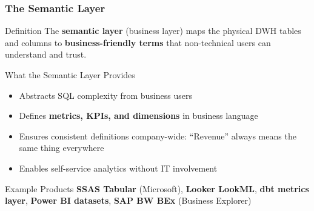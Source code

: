 \begin{frame}
  \frametitle{The Semantic Layer}

  \begin{block}{Definition}
    The \textbf{semantic layer} (business layer) maps the physical DWH
    tables and columns to \textbf{business-friendly terms} that
    non-technical users can understand and trust.
  \end{block}

  \begin{block}{What the Semantic Layer Provides}
    \begin{itemize}
      \item Abstracts SQL complexity from business users
      \item Defines \textbf{metrics, KPIs, and dimensions} in business language
      \item Ensures consistent definitions company-wide:
        ``Revenue'' always means the same thing everywhere
      \item Enables self-service analytics without IT involvement
    \end{itemize}
  \end{block}

  \begin{examples}{Example Products}
    \textbf{SSAS Tabular} (Microsoft), \textbf{Looker LookML},
    \textbf{dbt metrics layer}, \textbf{Power BI datasets},
    \textbf{SAP BW BEx} (Business Explorer)
  \end{examples}
\end{frame}

